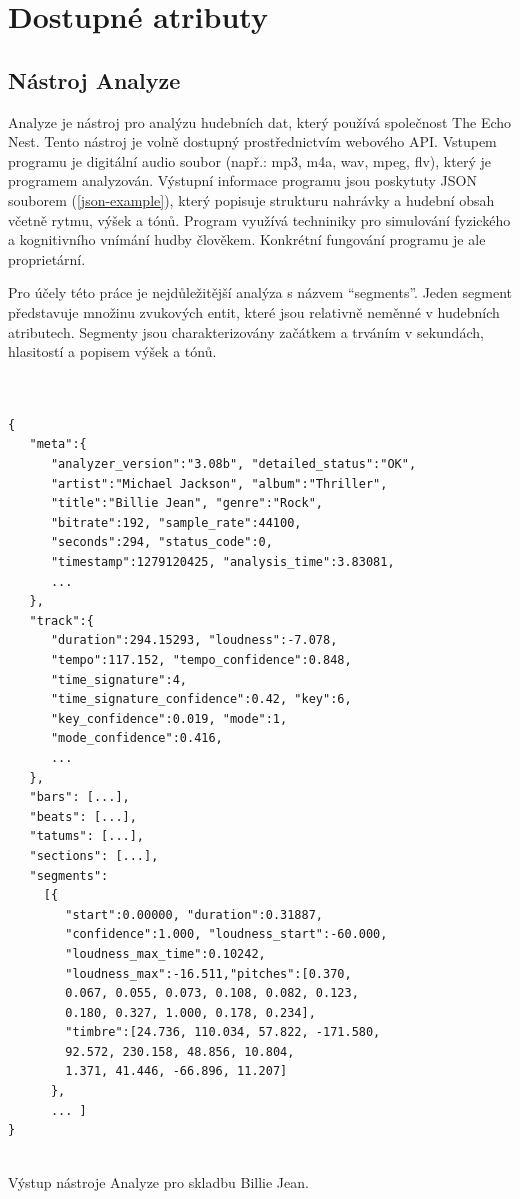 \documentclass[thesis=M,czech]{FITthesis}[2012/06/26]
\begin{document}
\section{Dostupné atributy}
\subsection{Nástroj Analyze}

Analyze je nástroj pro analýzu hudebních dat, který používá společnost The Echo Nest. 
Tento nástroj je volně dostupný prostřednictvím webového API. Vstupem programu je digitální audio soubor (např.:  mp3, m4a, wav, mpeg, flv), který je programem analyzován. Výstupní informace programu jsou poskytuty JSON souborem (\ref{json-example}), který popisuje strukturu nahrávky a hudební obsah včetně rytmu, výšek a tónů. Program využívá techniniky pro simulování fyzického a kognitivního vnímání hudby člověkem. Konkrétní fungování programu je ale proprietární. 

 Pro účely této práce je nejdůležitější analýza s názvem “segments”. Jeden segment představuje množinu zvukových entit, které jsou relativně neměnné v hudebních atributech. Segmenty jsou charakterizovány začátkem a trváním v sekundách, hlasitostí a popisem výšek a tónů.



\begin{listing}
\begin{verbatim}


{  
   "meta":{  
      "analyzer_version":"3.08b", "detailed_status":"OK",
      "artist":"Michael Jackson", "album":"Thriller",
      "title":"Billie Jean", "genre":"Rock",
      "bitrate":192, "sample_rate":44100,
      "seconds":294, "status_code":0,
      "timestamp":1279120425, "analysis_time":3.83081,
      ...
   },
   "track":{  
      "duration":294.15293, "loudness":-7.078,
      "tempo":117.152, "tempo_confidence":0.848,
      "time_signature":4,
      "time_signature_confidence":0.42, "key":6,
      "key_confidence":0.019, "mode":1,
      "mode_confidence":0.416,
      ...
   },
   "bars": [...],
   "beats": [...],
   "tatums": [...],
   "sections": [...],
   "segments":
     [{ 
        "start":0.00000, "duration":0.31887,
        "confidence":1.000, "loudness_start":-60.000,
        "loudness_max_time":0.10242,
        "loudness_max":-16.511,"pitches":[0.370,
        0.067, 0.055, 0.073, 0.108, 0.082, 0.123,
        0.180, 0.327, 1.000, 0.178, 0.234],
        "timbre":[24.736, 110.034, 57.822, -171.580,
        92.572, 230.158, 48.856, 10.804,
        1.371, 41.446, -66.896, 11.207]
      },
      ... ]
}


\end{verbatim}
\caption{Výstup nástroje Analyze pro skladbu Billie Jean.} 
\label{json-example}
\end{listing}
\end{document}
